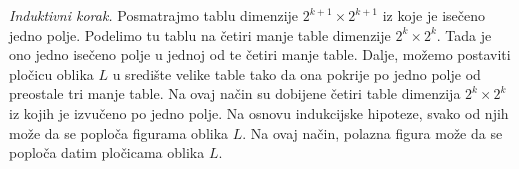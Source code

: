 \begin{center}
\end{center}

{\it Induktivni korak.} Posmatrajmo tablu dimenzije $2^{k+1}\times 2^{k+1}$ iz koje je ise\v ceno jedno polje. Podelimo tu tablu na \v cetiri manje table dimenzije $2^k\times 2^k$. Tada je ono jedno ise\v ceno polje u jednoj od te \v cetiri manje table. Dalje, mo\v zemo postaviti plo\v cicu oblika $L$ u sredi\v ste velike table tako da ona pokrije po jedno polje od preostale tri manje table. Na ovaj na\v cin su dobijene \v cetiri table dimenzija $2^k\times 2^k$ iz kojih je izvu\v ceno po jedno polje. Na osnovu indukcijske hipoteze, svako od njih mo\v ze da se poplo\v ca figurama oblika $L$. Na ovaj na\v cin, polazna figura mo\v ze da se poplo\v ca datim plo\v cicama oblika $L$.


